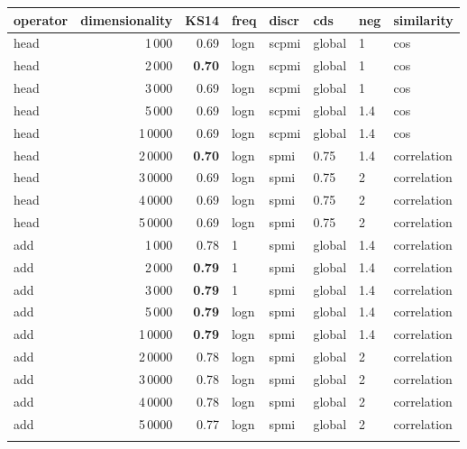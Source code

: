 \begin{tabular}{lrrlllll}
\toprule
operator &  dimensionality &  KS14 &  freq &  discr &     cds &  neg &     similarity \\
\midrule
    head &            1\,000 &  0.69 &  logn &  scpmi &  global &    1 &            cos \\
    head &            2\,000 &  \textbf{0.70} &  logn &  scpmi &  global &    1 &            cos \\
    head &            3\,000 &  0.69 &  logn &  scpmi &  global &    1 &            cos \\
    head &            5\,000 &  0.69 &  logn &  scpmi &  global &  1.4 &            cos \\
    head &           1\,0000 &  0.69 &  logn &  scpmi &  global &  1.4 &            cos \\
    head &           2\,0000 &  \textbf{0.70} &  logn &   spmi &    0.75 &  1.4 &    correlation \\
    head &           3\,0000 &  0.69 &  logn &   spmi &    0.75 &    2 &    correlation \\
    head &           4\,0000 &  0.69 &  logn &   spmi &    0.75 &    2 &    correlation \\
    head &           5\,0000 &  0.69 &  logn &   spmi &    0.75 &    2 &    correlation \\ \addlinespace
     add &            1\,000 &  0.78 &     1 &   spmi &  global &  1.4 &    correlation \\
     add &            2\,000 &  \textbf{0.79} &     1 &   spmi &  global &  1.4 &    correlation \\
     add &            3\,000 &  \textbf{0.79} &     1 &   spmi &  global &  1.4 &    correlation \\
     add &            5\,000 &  \textbf{0.79} &  logn &   spmi &  global &  1.4 &    correlation \\
     add &           1\,0000 &  \textbf{0.79} &  logn &   spmi &  global &  1.4 &    correlation \\
     add &           2\,0000 &  0.78 &  logn &   spmi &  global &    2 &    correlation \\
     add &           3\,0000 &  0.78 &  logn &   spmi &  global &    2 &    correlation \\
     add &           4\,0000 &  0.78 &  logn &   spmi &  global &    2 &    correlation \\
     add &           5\,0000 &  0.77 &  logn &   spmi &  global &    2 &    correlation \\ \addlinespace

\end{tabular}
